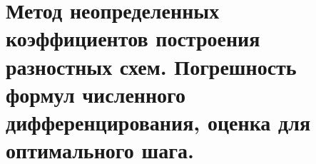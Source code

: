 \section{Метод неопределенных коэффициентов построения разностных схем. Погрешность формул численного дифференцирования, оценка для оптимального шага.}
